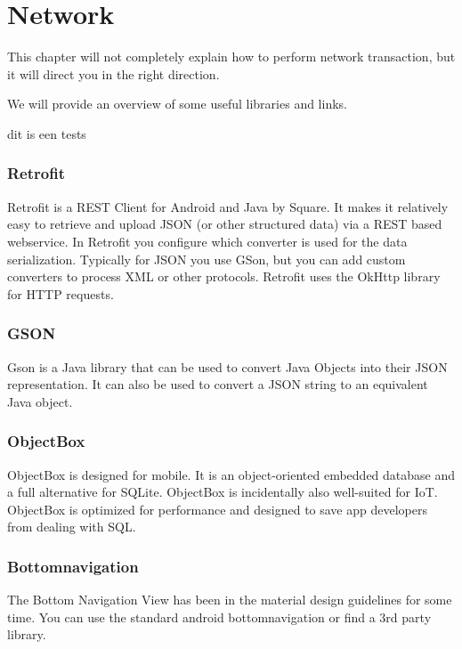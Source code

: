 
\chapter{Network}
This chapter will not completely explain how to perform network transaction, but it will direct you in the right direction. 

We will provide an overview of some useful libraries and links.

dit is een tests

\subsection{Retrofit}
Retrofit is a REST Client for Android and Java by Square. It makes it relatively easy to retrieve and upload JSON (or other structured data) via a REST based webservice. In Retrofit you configure which converter is used for the data serialization. Typically for JSON you use GSon, but you can add custom converters to process XML or other protocols. Retrofit uses the OkHttp library for HTTP requests.

\subsection{GSON}
Gson is a Java library that can be used to convert Java Objects into their JSON representation. It can also be used to convert a JSON string to an equivalent Java object. 

\subsection{ObjectBox}
ObjectBox is designed for mobile. It is an object-oriented embedded database and a full alternative for SQLite. ObjectBox is incidentally also well-suited for IoT.
ObjectBox is optimized for performance and designed to save app developers from dealing with SQL.

\subsection{Bottomnavigation}
The Bottom Navigation View has been in the material design guidelines for some time. You can use the standard android bottomnavigation or find a 3rd party library.

